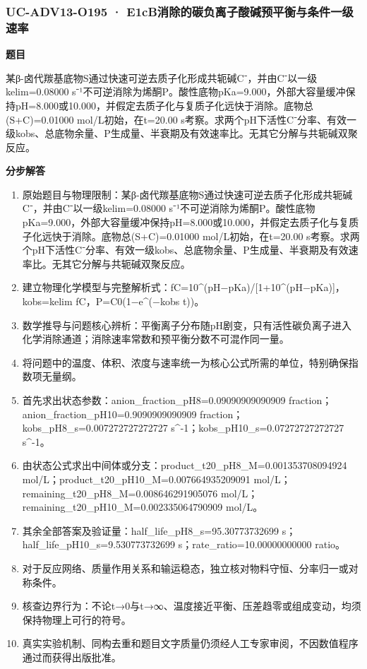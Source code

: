 \documentclass[UTF8,11pt,a4paper]{ctexart}
\begin{document}
\subsubsection*{UC-ADV13-O195 · E1cB消除的碳负离子酸碱预平衡与条件一级速率}
\noindent\textbf{题目}\par
某β-卤代羰基底物S通过快速可逆去质子化形成共轭碱C⁻，并由C⁻以一级kelim=0.08000 s⁻¹不可逆消除为烯酮P。酸性底物pKa=9.000，外部大容量缓冲保持pH=8.000或10.000，并假定去质子化与复质子化远快于消除。底物总(S+C)=0.01000 mol/L初始，在t=20.00 s考察。求两个pH下活性C⁻分率、有效一级kobs、总底物余量、P生成量、半衰期及有效速率比。无其它分解与共轭碱双聚反应。\par
\medskip\noindent\textbf{分步解答}
\begin{enumerate}
\item 原始题目与物理限制：某β-卤代羰基底物S通过快速可逆去质子化形成共轭碱C⁻，并由C⁻以一级kelim=0.08000 s⁻¹不可逆消除为烯酮P。酸性底物pKa=9.000，外部大容量缓冲保持pH=8.000或10.000，并假定去质子化与复质子化远快于消除。底物总(S+C)=0.01000 mol/L初始，在t=20.00 s考察。求两个pH下活性C⁻分率、有效一级kobs、总底物余量、P生成量、半衰期及有效速率比。无其它分解与共轭碱双聚反应。
\item 建立物理化学模型与完整解析式：fC=10\textasciicircum{}(pH−pKa)/[1+10\textasciicircum{}(pH−pKa)]，kobs=kelim fC，P=C0(1−e\textasciicircum{}(−kobs t))。
\item 数学推导与问题核心辨析：平衡离子分布随pH剧变，只有活性碳负离子进入化学消除通道；消除速率常数和预平衡分数不可混作同一量。
\item 将问题中的温度、体积、浓度与速率统一为核心公式所需的单位，特别确保指数项无量纲。
\item 首先求出状态参数：anion\_fraction\_pH8=0.09090909090909 fraction；anion\_fraction\_pH10=0.9090909090909 fraction；kobs\_pH8\_s=0.007272727272727 s\textasciicircum{}-1；kobs\_pH10\_s=0.07272727272727 s\textasciicircum{}-1。
\item 由状态公式求出中间体或分支：product\_t20\_pH8\_M=0.001353708094924 mol/L；product\_t20\_pH10\_M=0.007664935209091 mol/L；remaining\_t20\_pH8\_M=0.008646291905076 mol/L；remaining\_t20\_pH10\_M=0.002335064790909 mol/L。
\item 其余全部答案及验证量：half\_life\_pH8\_s=95.30773732699 s；half\_life\_pH10\_s=9.530773732699 s；rate\_ratio=10.00000000000 ratio。
\item 对于反应网络、质量作用关系和输运稳态，独立核对物料守恒、分率归一或对称条件。
\item 核查边界行为：不论t→0与t→∞、温度接近平衡、压差趋零或组成变动，均须保持物理上可行的符号。
\item 真实实验机制、同构去重和题目文字质量仍须经人工专家审阅，不因数值程序通过而获得出版批准。
\end{enumerate}
\end{document}
